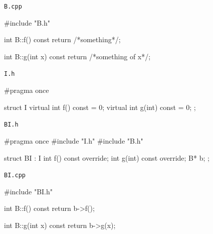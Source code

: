 \newsavebox\classBIcpp
\begin{lrbox}{\classBIcpp}%
\begin{minipage}[\baselineskip]{\codewidth}
\texttt{B.cpp}
\begin{cppcode}[numbers = none]
#include "B.h"

int B::f() const {
  return /*something*/;
}

int B::g(int x) const {
  return /*something of x*/;
}
\end{cppcode}
\end{minipage}%
\end{lrbox}

\newsavebox\classIVh
\begin{lrbox}{\classIVh}%
\begin{minipage}[\baselineskip]{\codewidth+0.5cm}
\texttt{I.h}
\begin{cppcode}[numbers = none]
#pragma once

struct I {
  virtual int f() const = 0;
  virtual int g(int) const = 0;
};
\end{cppcode}
\end{minipage}%
\end{lrbox}

\newsavebox\classBIAh
\begin{lrbox}{\classBIAh}%
\begin{minipage}[\baselineskip]{\codewidth}
\texttt{BI.h}
\begin{cppcode}[numbers = none]
#pragma once
#include "I.h"
#include "B.h"

struct BI : I {
  int f() const override;
  int g(int) const override;
  B* b;
};
\end{cppcode}
\end{minipage}%
\end{lrbox}

\newsavebox\classBIAcpp
\begin{lrbox}{\classBIAcpp}%
\begin{minipage}[\baselineskip]{\codewidth}
\texttt{BI.cpp}
\begin{cppcode}[numbers = none]
#include "BI.h"

int B::f() const {
  return b->f();
}

int B::g(int x) const {
  return b->g(x);
}
\end{cppcode}
\end{minipage}%
\end{lrbox}

